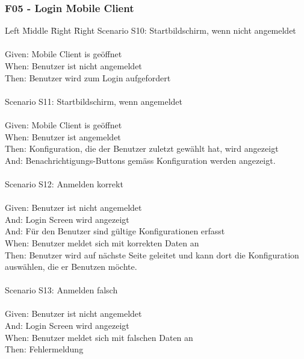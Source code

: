 \subsubsection*{F05 - Login Mobile Client}
\begin{tabbing}
    Left \= Middle \= Right \= Right  \kill
    Scenario S10: \> \> \>  Startbildschirm, wenn nicht angemeldet\\ \\
    Given: \> \> \>   Mobile Client is geöffnet\\
    When: \> \> \>  Benutzer ist nicht angemeldet\\
    Then: \> \> \>  Benutzer wird zum Login aufgefordert\\
    \\
    Scenario S11: \> \> \>  Startbildschirm, wenn angemeldet\\ \\
    Given: \> \> \>   Mobile Client is geöffnet\\
    When: \> \> \>  Benutzer ist angemeldet\\
    Then: \> \> \>  Konfiguration, die der Benutzer zuletzt gewählt hat, wird angezeigt\\
    And: \> \> \>    Benachrichtigungs-Buttons gemäss Konfiguration werden angezeigt.\\
    \\
    Scenario S12: \> \> \>  Anmelden korrekt\\ \\
    Given: \> \> \>  Benutzer ist nicht angemeldet\\
    And: \> \> \>    Login Screen wird angezeigt\\
    And: \> \> \>     Für den Benutzer sind gültige Konfigurationen erfasst\\
    When: \> \> \>   Benutzer meldet sich mit korrekten Daten an\\
    Then: \> \> \>   Benutzer wird auf nächste Seite geleitet und kann dort die Konfiguration auswählen, die er Benutzen möchte.\\
    \\
    Scenario S13: \> \> \>  Anmelden falsch\\ \\
    Given: \> \> \>  Benutzer ist nicht angemeldet\\
    And: \> \> \>    Login Screen wird angezeigt\\
    When: \> \> \>   Benutzer meldet sich mit falschen Daten an\\
    Then: \> \> \>   Fehlermeldung\\

\end{tabbing}
